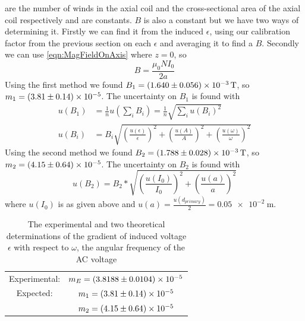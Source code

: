 \documentclass[12pt]{article}
\numberwithin{equation}{section}
\numberwithin{figure}{section}
\numberwithin{table}{section}
\begin{document}
    are the number of winds in the axial coil and the cross-sectional area of the axial coil 
    respectively and are constants. $B$ is also a constant but we have two ways of determining 
    it. Firstly we can find it from the induced $\epsilon$, using our calibration factor from 
    the previous section on each $\epsilon$ and averaging it to find a $B$. Secondly we can 
    use \autoref{eqn:MagFieldOnAxis} where $z=0$, so 
    \begin{equation}
        B=\frac{\mu_0NI_0}{2a}
        \label{eqn:MagFieldAt0}
    \end{equation}
    Using the first method we found $B_1=\SI{1.640\pm0.056e-3}{\tesla}$, so \newline
    $m_1=\num{3.81\pm0.14e-05}$. The uncertainty on $B_1$ is found with 
    \begin{align*}
        u(B_1)&=\frac{1}{n}u(\sum_i B_i) =\frac{1}{n}\sqrt{\sum_i u(B_i)^2}\\
        u(B_i)&=B_i\sqrt{\left( \frac{u(\epsilon)}{\epsilon}\right)^2+\left( \frac{u(A)}{A}\right)^2+\left( \frac{u(\omega)}{\omega}\right)^2}
    \end{align*}
    Using the second method we found $B_2=\SI{1.788\pm0.028e-3}{\tesla}$, so \newline
    $m_2=\num{4.15\pm0.64e-5}$. The uncertainty on $B_2$ is found with
    \begin{equation*}
        u(B_2)=B_2*\sqrt{\left( \frac{u(I_0)}{I_0}\right)^2+\left( \frac{u(a)}{a}\right)^2}
    \end{equation*}
    where $u(I_0)$ is as given above and $u(a)=\frac{u(d_{primary})}{2}=\SI{0.05e-2}{\metre}$.
    \begin{table}[H]
        \centering
        \begin{tabular}{c c}
            Experimental: & $m_E = \num{3.8188\pm0.0104e-05}$\\
            Expected: & $m_1 = \num{3.81\pm0.14e-05}$\\
            & $m_2 = \num{4.15\pm0.64e-5}$
        \end{tabular}
        \caption{The experimental and two theoretical determinations of the gradient of 
        induced voltage $\epsilon$ with respect to $\omega$, the angular frequency of the AC voltage}
        \label{tbl:ExpectedGradients}
    \end{table}
    
\end{document}
